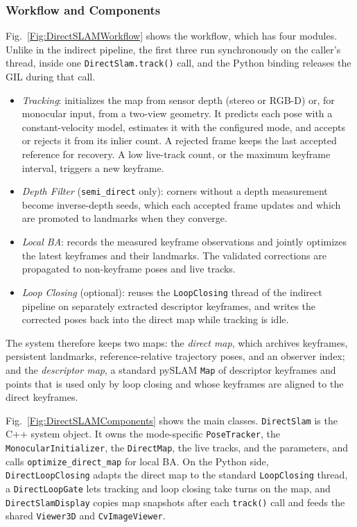 \documentclass{article}
\begin{document}
\subsubsection{Workflow and Components}

Fig.~\ref{Fig:DirectSLAMWorkflow} shows the workflow, which has four modules. Unlike in the indirect pipeline, the first three run synchronously on the caller's thread, inside one \texttt{DirectSlam.track()} call, and the Python binding releases the GIL during that call.
\begin{itemize}
\item \textit{Tracking}: initializes the map from sensor depth (stereo or RGB-D) or, for monocular input, from a two-view geometry. It predicts each pose with a constant-velocity model, estimates it with the configured mode, and accepts or rejects it from its inlier count. A rejected frame keeps the last accepted reference for recovery. A low live-track count, or the maximum keyframe interval, triggers a new keyframe.
\item \textit{Depth Filter} (\texttt{semi\_direct} only): corners without a depth measurement become inverse-depth seeds, which each accepted frame updates and which are promoted to landmarks when they converge.
\item \textit{Local BA}: records the measured keyframe observations and jointly optimizes the latest keyframes and their landmarks. The validated corrections are propagated to non-keyframe poses and live tracks.
\item \textit{Loop Closing} (optional): reuses the \texttt{LoopClosing} thread of the indirect pipeline on separately extracted descriptor keyframes, and writes the corrected poses back into the direct map while tracking is idle.
\end{itemize}

The system therefore keeps two maps: the \emph{direct map}, which archives keyframes, persistent landmarks, reference-relative trajectory poses, and an observer index; and the \emph{descriptor map}, a standard pySLAM \texttt{Map} of descriptor keyframes and points that is used only by loop closing and whose keyframes are aligned to the direct keyframes.

Fig.~\ref{Fig:DirectSLAMComponents} shows the main classes. \texttt{DirectSlam} is the C++ system object. It owns the mode-specific \texttt{PoseTracker}, the \texttt{MonocularInitializer}, the \texttt{DirectMap}, the live tracks, and the parameters, and calls \texttt{optimize\_direct\_map} for local BA. On the Python side, \texttt{DirectLoopClosing} adapts the direct map to the standard \texttt{LoopClosing} thread, a \texttt{DirectLoopGate} lets tracking and loop closing take turns on the map, and \texttt{DirectSlamDisplay} copies map snapshots after each \texttt{track()} call and feeds the shared \texttt{Viewer3D} and \texttt{CvImageViewer}.
\end{document}
